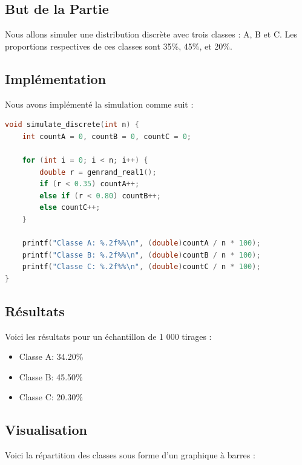 \documentclass[a4paper,12pt]{report}
\begin{document}
\subsection*{But de la Partie}
Nous allons simuler une distribution discrète avec trois classes : A, B et C. Les proportions respectives de ces classes sont 35\%, 45\%, et 20\%.

\subsection*{Implémentation}
Nous avons implémenté la simulation comme suit :

\begin{lstlisting}[language=C]
void simulate_discrete(int n) {
    int countA = 0, countB = 0, countC = 0;

    for (int i = 0; i < n; i++) {
        double r = genrand_real1();
        if (r < 0.35) countA++;
        else if (r < 0.80) countB++;
        else countC++;
    }

    printf("Classe A: %.2f%%\n", (double)countA / n * 100);
    printf("Classe B: %.2f%%\n", (double)countB / n * 100);
    printf("Classe C: %.2f%%\n", (double)countC / n * 100);
}
\end{lstlisting}

\subsection*{Résultats}
Voici les résultats pour un échantillon de 1 000 tirages :

\begin{itemize}
    \item Classe A: 34.20\%
    \item Classe B: 45.50\%
    \item Classe C: 20.30\%
\end{itemize}

\subsection*{Visualisation}
Voici la répartition des classes sous forme d'un graphique à barres :
\end{document}
